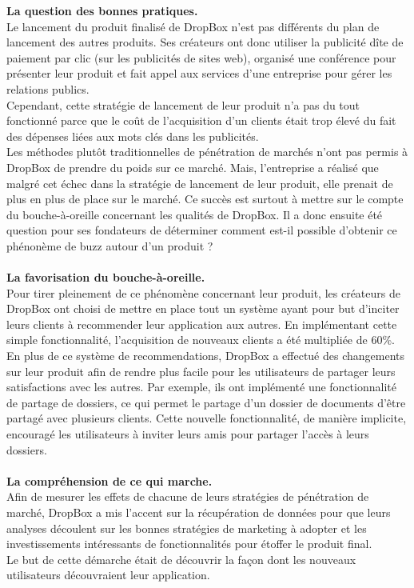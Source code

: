 \documentclass[a4paper, 10pt]{article}
\begin{document}
\textbf{La question des bonnes pratiques.}\\
Le lancement du produit finalisé de DropBox n'est pas différents du plan de lancement des autres produits.
Ses créateurs ont donc utiliser la publicité dîte de paiement par clic (sur les publicités de sites web),
organisé une conférence pour présenter leur produit et fait appel aux services d'une entreprise pour gérer les relations publics.\\
Cependant, cette stratégie de lancement de leur produit n'a pas du tout fonctionné parce que le coût de l'acquisition d'un clients
était trop élevé du fait des dépenses liées aux mots clés dans les publicités.\\
Les méthodes plutôt traditionnelles de pénétration de marchés n'ont pas permis à DropBox de prendre du poids sur ce marché.
Mais, l'entreprise a réalisé que malgré cet échec dans la stratégie de lancement de leur produit,
elle prenait de plus en plus de place sur le marché.
Ce succès est surtout à mettre sur le compte du bouche-à-oreille concernant les qualités de DropBox.
Il a donc ensuite été question pour ses fondateurs de déterminer comment est-il possible d'obtenir ce phénonème de buzz autour d'un produit ?\\ \\
\textbf{La favorisation du bouche-à-oreille.}\\
Pour tirer pleinement de ce phénomène concernant leur produit, les créateurs de DropBox ont choisi de mettre en place tout un système
ayant pour but d'inciter leurs clients à recommender leur application aux autres.
En implémentant cette simple fonctionnalité, l'acquisition de nouveaux clients a été multipliée de 60\%.\\
En plus de ce système de recommendations, DropBox a effectué des changements sur leur produit afin de rendre plus facile pour les utilisateurs
de partager leurs satisfactions avec les autres.
Par exemple, ils ont implémenté une fonctionnalité de partage de dossiers, ce qui permet le partage d'un dossier de documents d'être partagé
avec plusieurs clients. Cette nouvelle fonctionnalité, de manière implicite, encouragé les utilisateurs à inviter leurs amis pour
partager l'accès à leurs dossiers.\\ \\
\textbf{La compréhension de ce qui marche.}\\
Afin de mesurer les effets de chacune de leurs stratégies de pénétration de marché, DropBox a mis l'accent sur la récupération de données
pour que leurs analyses découlent sur les bonnes stratégies de marketing à adopter et les investissements intéressants
de fonctionnalités pour étoffer le produit final.\\
Le but de cette démarche était de découvrir la façon dont les nouveaux utilisateurs découvraient leur application.\\ \\
\end{document}
